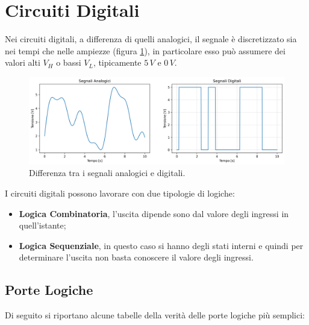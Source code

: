 \documentclass[a4paper,12pt]{article}
\begin{document}


\section*{Circuiti Digitali}

Nei circuiti digitali, a differenza di quelli analogici, il segnale è discretizzato sia nei tempi che nelle ampiezze (figura \ref{fig:digitali-differenza}), in particolare esso può assumere dei valori alti $V_H$ o bassi $V_L$, tipicamente $5\,V$ e $0\,V$.

\begin{figure}[h]
	\centering
	\includegraphics[width=1\linewidth]{immagini/circuiti-digitali/differenza-circuiti-analogici-digitali.png}
	\caption{Differenza tra i segnali analogici e digitali.}
	\label{fig:digitali-differenza}
\end{figure}

I circuiti digitali possono lavorare con due tipologie di logiche:
\begin{itemize}
	\item \textbf{Logica Combinatoria}, l'uscita dipende sono dal valore degli ingressi in quell'istante;
	\item \textbf{Logica Sequenziale}, in questo caso si hanno degli stati interni e quindi per determinare l'uscita non basta conoscere il valore degli ingressi.
\end{itemize}

\subsection*{Porte Logiche}
Di seguito si riportano alcune tabelle della verità delle porte logiche più semplici:
\end{document}
